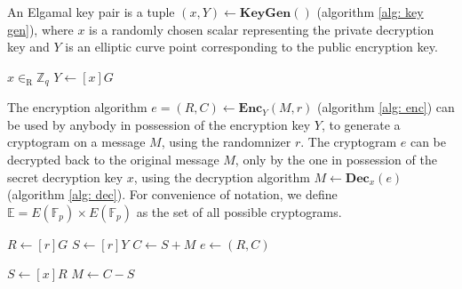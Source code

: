 An Elgamal key pair is a tuple \( (x, Y) \leftarrow \mathbf{KeyGen()} \) (algorithm \ref{alg: key gen}), where $x$ is a randomly chosen scalar representing the private decryption key and $Y$ is an elliptic curve point corresponding to the public encryption key.

\begin{algorithm}[H]
\DontPrintSemicolon
    \caption{\( \mathbf{KeyGen} () \)}
    \( x \in_\mathrm{R} \mathbb{Z}_q \)\;
    \( Y \gets [x]G \)\;
     
\end{algorithm}

The encryption algorithm \( e = (R, C) \leftarrow \mathbf{Enc}_Y (M, r) \) (algorithm \ref{alg: enc}) can be used by anybody in possession of the encryption key $Y$, to generate a cryptogram on a message $M$, using the randomnizer $r$. The cryptogram $e$ can be decrypted back to the original message $M$, only by the one in possession of the secret decryption key $x$, using the decryption algorithm \( M \leftarrow \mathbf{Dec}_x (e) \) (algorithm \ref{alg: dec}). For convenience of notation, we define \( \mathbb{E} = E(\mathbb{F}_p) \times E(\mathbb{F}_p) \) as the set of all possible cryptograms.

\begin{algorithm}[H]
\DontPrintSemicolon
    \caption{\( \mathbf{Enc}_Y (M, r) \)}
    \( R \gets [r]G \)\;
    \( S \gets [r]Y \)\;
    \( C \gets S + M \)\;
    \( e \gets (R, C) \)\;
     
\end{algorithm}

\begin{algorithm}[H]
\DontPrintSemicolon
    \caption{\( \mathbf{Dec}_x (e) \)}
    \( S \gets [x]R \)\;
    \( M \gets C - S \)\;
     
\end{algorithm}

